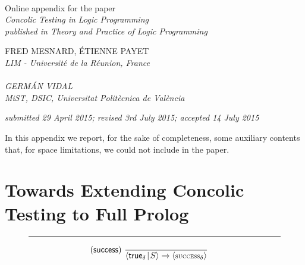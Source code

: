 \documentclass[fleqn]{tlp}
\newcommand{\midd}{\!\mid\!}
\newcommand{\success}{\mbox{\footnotesize \textsc{success}}}
\def \tuple#1{\langle #1 \rangle}
\begin{document}
\clearpage

\begin{appendix}

\pagestyle{plain}

\mbox{}\\[1ex]

  \begin{center}
    {\large\textnormal{Online appendix for the paper}}   \\
    \LARGE\em Concolic Testing in Logic Programming\\
    {\large\textnormal{published in Theory and Practice of Logic Programming}}
  \end{center}

\vspace{1ex}

  \begin{center}
    FRED MESNARD, \'ETIENNE PAYET \\
\em LIM - Universit\'e de la R\'eunion, France\\
 \\[1ex]
GERM\'AN VIDAL \\
\em MiST, DSIC, Universitat Polit\`ecnica de Val\`encia\\
  \end{center}

\vspace{.5ex}

  \begin{center}
    \emph{ submitted 29 April 2015; revised 3rd July 2015; accepted 14
      July 2015 } 
  \end{center}

\vspace{1.5ex}

In this appendix we report, for the sake of completeness, some
auxiliary contents that, for space limitations, we could not include
in the paper. 

\section{Towards Extending Concolic Testing to Full Prolog} \label{fullsemantics}


\begin{figure}[b]
  \rule{\linewidth}{1pt}
  \[
  \hspace{-3ex}\begin{array}{r@{~}l}
    \mathsf{(success)} & {\displaystyle 
      \frac{~} 
        {\tuple{\mathsf{true}_\delta\midd S} \to \tuple{\success_\delta}}
        } 
        \\[2ex]


\end{array}\]
\end{figure}
\end{appendix}
\end{document}

